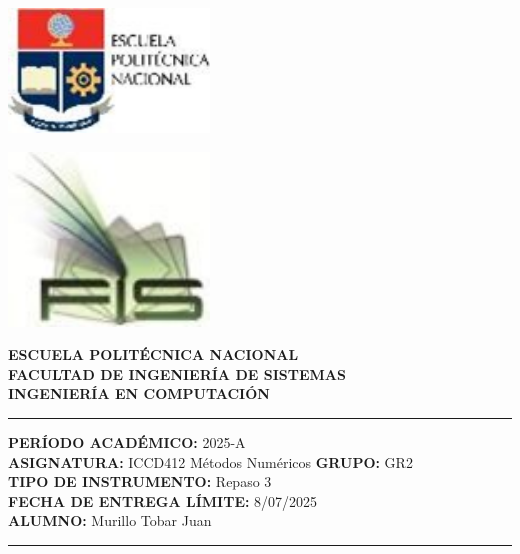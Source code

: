 \documentclass[12pt]{article}
\begin{document}
\begin{minipage}{0.45\textwidth}
    \includegraphics[width=0.4\textwidth]{inFiles/Figures/epnLogo.jpg}
\end{minipage}
\hfill
\begin{minipage}{0.45\textwidth}
    \raggedleft
    \includegraphics[width=0.4\textwidth]{inFiles/Figures/FIS_logo.jpg}
\end{minipage}

\vspace{0.5cm}

\begin{center}
    \textbf{ESCUELA POLITÉCNICA NACIONAL}\\[0.2cm]
    \textbf{FACULTAD DE INGENIERÍA DE SISTEMAS}\\[0.2cm]
    \textbf{INGENIERÍA {\textbf{EN COMPUTACIÓN}}}
\end{center}

\vspace{0.5cm}
\hrule
\vspace{0.5cm}

\noindent\textbf{PERÍODO ACADÉMICO:} 2025-A\\[0.2cm]
\noindent\textbf{ASIGNATURA:} ICCD412 Métodos Numéricos \hfill \textbf{GRUPO:} GR2\\[0.2cm]
\noindent\textbf{TIPO DE INSTRUMENTO:} Repaso 3\\[0.2cm]
\noindent\textbf{FECHA DE ENTREGA LÍMITE:} 8/07/2025\\[0.2cm]
\noindent\textbf{ALUMNO:} Murillo Tobar Juan

\vspace{0.5cm}
\hrule
\vspace{1cm}
\end{document}
